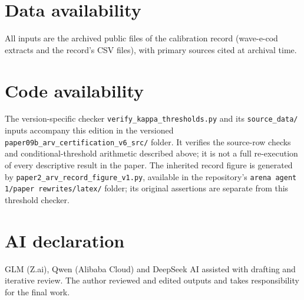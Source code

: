 \documentclass[10pt,twocolumn]{article}
\theoremstyle{plain}
\theoremstyle{remark}
\begin{document}
\section*{Data availability}
All inputs are the archived public files of the calibration record
(wave-e-cod extracts and the record's CSV files), with primary sources
cited at archival time.

\section*{Code availability}
The version-specific checker
\texttt{verify\_kappa\_thresholds.py} and its \texttt{source\_data/}
inputs accompany this edition in the versioned
\texttt{paper09b\_arv\_certification\_v6\_src/} folder. It verifies
the source-row checks and conditional-threshold arithmetic described
above; it is not a full re-execution of every descriptive result in the
paper. The inherited
record figure is generated by
\texttt{paper2\_arv\_record\_figure\_v1.py}, available in the repository's
\texttt{arena agent 1/paper rewrites/latex/} folder; its original assertions
are separate from this threshold checker.

\section*{AI declaration}
GLM (Z.ai), Qwen (Alibaba Cloud) and DeepSeek AI assisted with drafting
and iterative review. The author reviewed and edited outputs and takes
responsibility for the final work.
\end{document}
